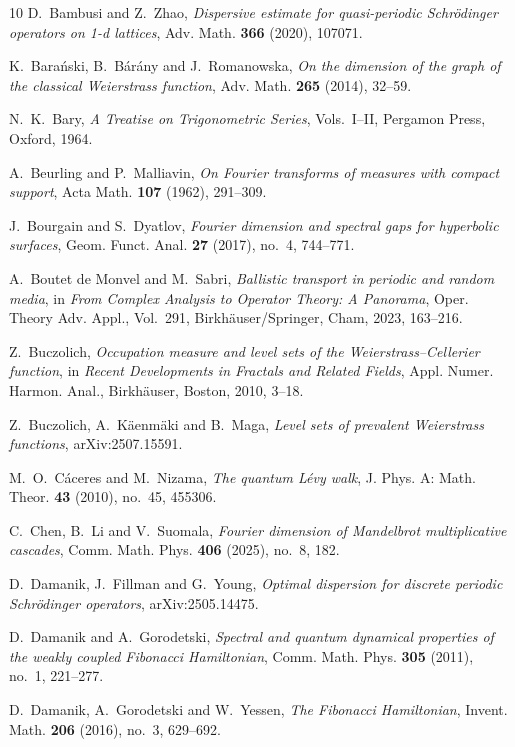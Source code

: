 \documentclass[11pt]{amsart}
\theoremstyle{plain}
\theoremstyle{definition}
\numberwithin{equation}{section}
\begin{document}
\begin{thebibliography}{10}
D.~Bambusi and Z.~Zhao, \emph{Dispersive estimate for quasi-periodic Schr\"odinger
operators on 1-d lattices}, Adv. Math. \textbf{366} (2020), 107071.

K.~Bara\'nski, B.~B\'ar\'any and J.~Romanowska,
\emph{On the dimension of the graph of the classical Weierstrass function},
Adv. Math. \textbf{265} (2014), 32--59.

N.~K.~Bary,
\emph{A Treatise on Trigonometric Series},
Vols.~I--II,
Pergamon Press, Oxford, 1964.

A.~Beurling and P.~Malliavin,
\emph{On Fourier transforms of measures with compact support},
Acta Math. \textbf{107} (1962), 291--309.

J.~Bourgain and S.~Dyatlov,
\emph{Fourier dimension and spectral gaps for hyperbolic surfaces},
Geom. Funct. Anal. \textbf{27} (2017), no.~4, 744--771.

A.~Boutet de Monvel and M.~Sabri,
\emph{Ballistic transport in periodic and random media},
in \emph{From Complex Analysis to Operator Theory: A Panorama},
Oper. Theory Adv. Appl., Vol.~291,
Birkh\"auser/Springer, Cham, 2023, 163--216.

Z.~Buczolich,
\emph{Occupation measure and level sets of the Weierstrass--Cellerier function},
in \emph{Recent Developments in Fractals and Related Fields},
Appl. Numer. Harmon. Anal.,
Birkh\"auser, Boston, 2010, 3--18.

Z.~Buczolich, A.~K\"aenm\"aki and B.~Maga,
\emph{Level sets of prevalent Weierstrass functions},
arXiv:2507.15591.

M.~O.~C\'aceres and M.~Nizama,
\emph{The quantum L\'evy walk},
J. Phys. A: Math. Theor. \textbf{43} (2010), no.~45, 455306.

C.~Chen, B.~Li and V.~Suomala,
\emph{Fourier dimension of Mandelbrot multiplicative cascades},
Comm. Math. Phys. \textbf{406} (2025), no.~8, 182.

D.~Damanik, J.~Fillman and G.~Young,
\emph{Optimal dispersion for discrete periodic Schr\"odinger operators},
arXiv:2505.14475.

D.~Damanik and A.~Gorodetski,
\emph{Spectral and quantum dynamical properties of the weakly coupled Fibonacci Hamiltonian},
Comm. Math. Phys. \textbf{305} (2011), no.~1, 221--277.

D.~Damanik, A.~Gorodetski and W.~Yessen,
\emph{The Fibonacci Hamiltonian},
Invent. Math. \textbf{206} (2016), no.~3, 629--692.


\end{thebibliography}
\end{document}
